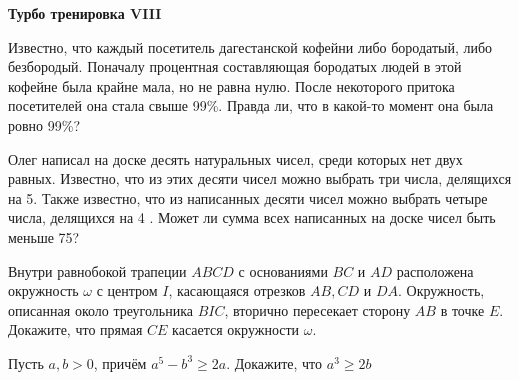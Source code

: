 \centerline{\bf \Huge Турбо тренировка VIII}
\centerline{\bf \Huge }

\begin{flushright}
        \scriptsize{}
\end{flushright}

Известно, что каждый посетитель дагестанской кофейни либо бородатый, либо безбородый. Поначалу процентная составляющая бородатых людей в этой кофейне была крайне мала, но  не равна нулю. После некоторого притока посетителей она стала свыше 99\%. Правда ли, что в какой-то момент она была ровно 99\%?

Олег написал на доске десять натуральных чисел, среди которых нет двух равных. Известно, что из этих десяти чисел можно выбрать три числа, делящихся на 5. Также известно, что из написанных десяти чисел можно выбрать четыре числа, делящихся на 4 . Может ли сумма всех написанных на доске чисел быть меньше 75?

Внутри равнобокой трапеции $A B C D$ с основаниями $B C$ и $A D$ расположена окружность $\omega$ с центром $I$, касающаяся отрезков $A B, C D$ и $D A$. Окружность, описанная около треугольника $B I C$, вторично пересекает сторону $A B$ в точке $E$. Докажите, что прямая $C E$ касается окружности $\omega$.

Пусть $a,b > 0$, причём $a^5 - b^3\geqslant 2a$. Докажите, что $a^3 \geqslant 2b$